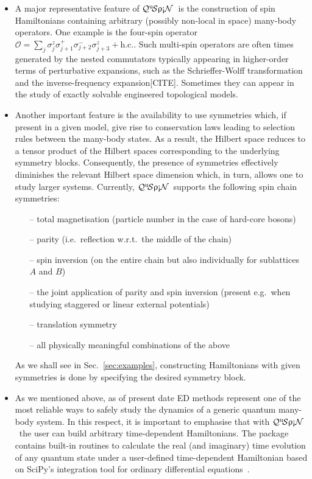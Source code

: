 \documentclass{SciPost}
\newcommand\0{\scalebox{-1}[1]{0}}
\newcommand{\qspin}{$\mathcal{Q}^{\mathrm{u}}\!\mathcal{S}\uprho\mathrm{\text{\textexclamdown}}\mathcal{N}$}
\begin{document}
\begin{itemize}
	\item A major representative feature of \qspin\ is the construction of spin Hamiltonians containing arbitrary (possibly non-local in space) many-body operators. One example is the four-spin operator $\mathcal{O}= \sum_j \sigma^z_{j}\sigma^+_{j+1}\sigma^-_{j+2}\sigma^z_{j+3} + \mathrm{h.c.}$. Such multi-spin operators are often times generated by the nested commutators typically appearing in higher-order terms of perturbative expansions, such as the Schrieffer-Wolff transformation~\cite{bukov_SW} and the inverse-frequency expansion[CITE]. Sometimes they can appear in the study of exactly solvable engineered topological models.
	\item Another important feature is the availability to use symmetries which, if present in a given model, give rise to conservation laws leading to selection rules between the many-body states. As a result, the Hilbert space reduces to a tensor product of the Hilbert spaces corresponding to the underlying symmetry blocks. Consequently, the presence of symmetries effectively diminishes the relevant Hilbert space dimension which, in turn, allows one to study larger systems. Currently, \qspin\ supports the following spin chain symmetries:
	\begin{itemize}
		\item[--] total magnetisation (particle number in the case of hard-core bosons)
		\item[--] parity (i.e.~reflection w.r.t.~the middle of the chain)
		\item[--] spin inversion (on the entire chain but also individually for sublattices $A$ and $B$)
		\item[--] the joint application of parity and spin inversion (present e.g.~when studying staggered or linear external potentials)
		\item[--] translation symmetry
		\item[--] all physically meaningful combinations of the above
	\end{itemize}
	 As we shall see in Sec.~\ref{sec:examples}, constructing Hamiltonians with given symmetries is done by specifying the desired symmetry block.
	\item As we mentioned above, as of present date ED methods represent one of the most reliable ways to safely study the dynamics of a generic quantum many-body system. In this respect, it is important to emphasise that with \qspin\ the user can build arbitrary time-dependent Hamiltonians. The package contains built-in routines to calculate the real (and imaginary) time evolution of any quantum state under a user-defined time-dependent Hamiltonian based on SciPy's integration tool for ordinary differential equations~\cite{SciPy_package}.

\end{itemize}
\end{document}

